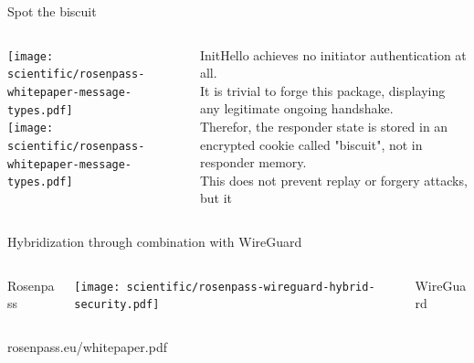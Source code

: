 \begin{frame}{Spot the biscuit}
  \begin{columns}[fullwidth,c]
    \begin{column}{.48\linewidth}
    \centering
    \vspace{.8em}
    \texttt{[image: scientific/rosenpass-whitepaper-message-types.pdf]}
    \\ \texttt{[image: scientific/rosenpass-whitepaper-message-types.pdf]}
    \end{column}

    \begin{column}{.48\linewidth}
        \centering
        InitHello achieves no initiator authentication at all.
        \\[.8em]
        It is trivial to forge this package, displaying any legitimate ongoing handshake.
        \\[.8em]
        Therefor, the responder state is stored in an encrypted cookie called "biscuit", not in responder memory.
        \\[.8em]
        This does not prevent replay or forgery attacks, but it 
    \end{column}
  \end{columns}
\end{frame}

\begin{frame}{Hybridization through combination with WireGuard}
  \begin{columns}[fullwidth,c]
    \begin{column}{.22\linewidth}
      \flushright
      Rosenpass
    \end{column}
    \begin{column}{.65\linewidth}
      \texttt{[image: scientific/rosenpass-wireguard-hybrid-security.pdf]}
    \end{column}
    \begin{column}{.25\linewidth}
      \flushleft
      WireGuard
    \end{column}
  \end{columns}
\end{frame}

\begin{frame}{}
  \centering

  \raggedright
  \footnotesize
  \hspace{-2.5em} rosenpass.eu/whitepaper.pdf
\end{frame}

